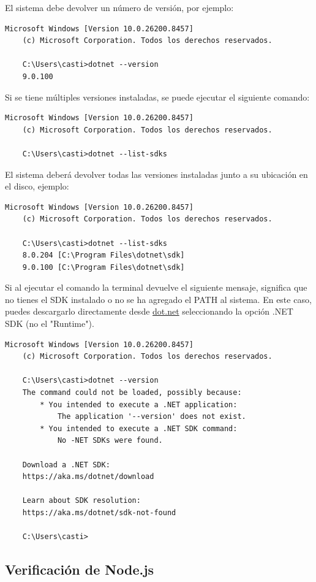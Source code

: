 \documentclass[
10pt, %
a4paper, %
oneside, %
headinclude,footinclude, %
BCOR5mm, %
]{scrartcl}
\begin{document}
El sistema debe devolver un número de versión, por ejemplo:

\begin{lstlisting}[language=DOS]
	Microsoft Windows [Version 10.0.26200.8457]
	(c) Microsoft Corporation. Todos los derechos reservados.
	
	C:\Users\casti>dotnet --version
	9.0.100
\end{lstlisting}

Si se tiene múltiples versiones instaladas, se puede ejecutar el siguiente comando:
\begin{lstlisting}[language=DOS]
	Microsoft Windows [Version 10.0.26200.8457]
	(c) Microsoft Corporation. Todos los derechos reservados.
	
	C:\Users\casti>dotnet --list-sdks
\end{lstlisting}

El sistema deberá devolver todas las versiones instaladas junto a su ubicación en el disco, ejemplo:
\begin{lstlisting}[language=DOS]
	Microsoft Windows [Version 10.0.26200.8457]
	(c) Microsoft Corporation. Todos los derechos reservados.
	
	C:\Users\casti>dotnet --list-sdks
	8.0.204 [C:\Program Files\dotnet\sdk]
	9.0.100 [C:\Program Files\dotnet\sdk]
\end{lstlisting}

Si al ejecutar el comando la terminal devuelve el siguiente mensaje, significa que no tienes el SDK instalado o no se ha agregado el PATH al sistema. En este caso, puedes descargarlo directamente desde \href{https://dotnet.microsoft.com/es-es/download/dotnet/9.0}{dot.net} seleccionando la opción .NET SDK (no el "Runtime").
\begin{lstlisting}[language=DOS]
	Microsoft Windows [Version 10.0.26200.8457]
	(c) Microsoft Corporation. Todos los derechos reservados.
	
	C:\Users\casti>dotnet --version
	The command could not be loaded, possibly because:
		* You intended to execute a .NET application:
			The application '--version' does not exist.
		* You intended to execute a .NET SDK command:
			No -NET SDKs were found.

	Download a .NET SDK:
	https://aka.ms/dotnet/download
	
	Learn about SDK resolution:
	https://aka.ms/dotnet/sdk-not-found
	
	C:\Users\casti>
\end{lstlisting}

\subsection{Verificación de Node.js}
\end{document}
